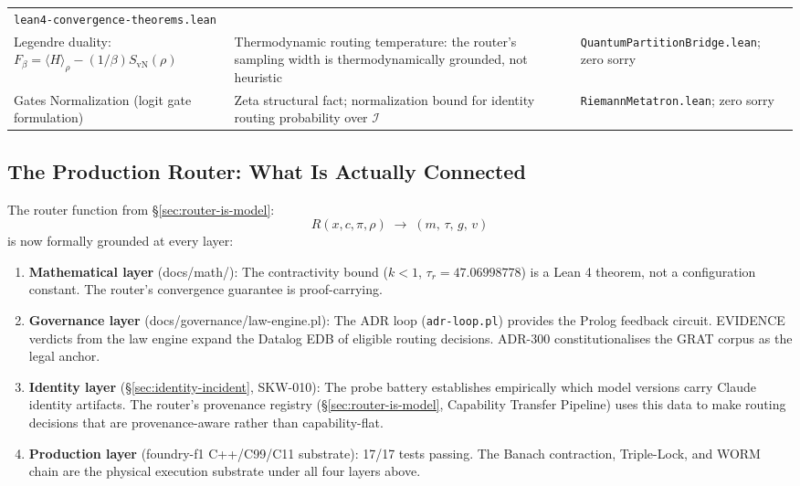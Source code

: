 \begin{table}[h]
\begin{tabular}{p{4.5cm}p{4.5cm}p{3.5cm}}
  \texttt{lean4-convergence-theorems.lean} \\
\addlinespace
Legendre duality: $F_\beta = \langle H \rangle_\rho - (1/\beta) S_\text{vN}(\rho)$
& Thermodynamic routing temperature: the router's sampling width is
  thermodynamically grounded, not heuristic &
  \texttt{QuantumPartitionBridge.lean}; zero sorry \\
\addlinespace
Gates Normalization (logit gate formulation) & Zeta structural fact;
  normalization bound for identity routing probability over $\mathcal{I}$ &
  \texttt{RiemannMetatron.lean}; zero sorry \\
\bottomrule
\end{tabular}
\end{table}

\subsection{The Production Router: What Is Actually Connected}

The router function from \S\ref{sec:router-is-model}:
\[
R(x, c, \pi, \rho) \;\rightarrow\; (m,\, \tau,\, g,\, v)
\]
is now formally grounded at every layer:

\begin{enumerate}

\item \textbf{Mathematical layer} (docs/math/): The contractivity bound
  ($k < 1$, $\tau_r = 47.06998778$) is a Lean 4 theorem, not a configuration
  constant. The router's convergence guarantee is proof-carrying.

\item \textbf{Governance layer} (docs/governance/law-engine.pl): The ADR loop
  (\texttt{adr-loop.pl}) provides the Prolog feedback circuit. EVIDENCE verdicts
  from the law engine expand the Datalog EDB of eligible routing decisions.
  ADR-300 constitutionalises the GRAT corpus as the legal anchor.

\item \textbf{Identity layer} (\S\ref{sec:identity-incident}, SKW-010):
  The probe battery establishes empirically which model versions carry Claude
  identity artifacts. The router's provenance registry (\S\ref{sec:router-is-model},
  Capability Transfer Pipeline) uses this data to make routing decisions that are
  provenance-aware rather than capability-flat.

\item \textbf{Production layer} (foundry-f1 C++/C99/C11 substrate): 17/17 tests
  passing. The Banach contraction, Triple-Lock, and WORM chain are the physical
  execution substrate under all four layers above.

\end{enumerate}

